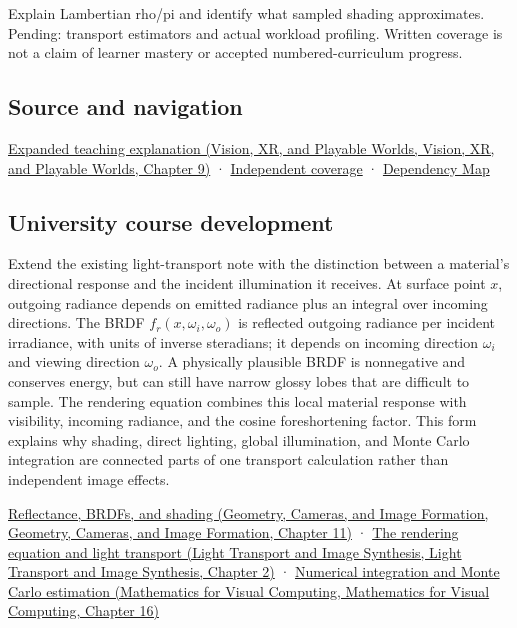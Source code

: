 Explain Lambertian rho/pi and identify what sampled shading approximates. Pending: transport estimators and actual workload profiling. Written coverage is not a claim of learner mastery or accepted numbered-curriculum progress.

\subsection{Source and navigation}\label{appendix-96da0b153b77-source-and-navigation}

\href{../07-Vision-XR-and-Playable-Worlds/main.pdf\#nameddest=04-visual-computing-ii-ch042-materials-turn-incoming-light-into-outgoing-light}{Expanded teaching explanation (Vision, XR, and Playable Worlds, Vision, XR, and Playable Worlds, Chapter 9)} · \hyperref[appendix-fd090d982a15-xr01---independent-seeing-and-representation-source]{Independent coverage} · \hyperref[appendix-4ad47bdd269a]{Dependency Map}

\subsection{University course development}\label{appendix-96da0b153b77-university-course-development}

Extend the existing light-transport note with the distinction between a material's directional response and the incident illumination it receives. At surface point \(x\), outgoing radiance depends on emitted radiance plus an integral over incoming directions. The BRDF \(f_r(x,\omega_i,\omega_o)\) is reflected outgoing radiance per incident irradiance, with units of inverse steradians; it depends on incoming direction \(\omega_i\) and viewing direction \(\omega_o\). A physically plausible BRDF is nonnegative and conserves energy, but can still have narrow glossy lobes that are difficult to sample. The rendering equation combines this local material response with visibility, incoming radiance, and the cosine foreshortening factor. This form explains why shading, direct lighting, global illumination, and Monte Carlo integration are connected parts of one transport calculation rather than independent image effects.

\href{../03-Geometry-Cameras-and-Image-Formation/main.pdf\#nameddest=03-visual-computing-i-ch004-reflectance-brdfs-and-shading}{Reflectance, BRDFs, and shading (Geometry, Cameras, and Image Formation, Geometry, Cameras, and Image Formation, Chapter 11)} · \href{../04-Light-Transport-and-Image-Synthesis/main.pdf\#nameddest=03-visual-computing-i-ch007-the-rendering-equation-and-light-transport}{The rendering equation and light transport (Light Transport and Image Synthesis, Light Transport and Image Synthesis, Chapter 2)} · \href{../02-Mathematics-for-Visual-Computing/main.pdf\#nameddest=03-visual-computing-i-ch012-numerical-integration-and-monte-carlo-estimation}{Numerical integration and Monte Carlo estimation (Mathematics for Visual Computing, Mathematics for Visual Computing, Chapter 16)}
